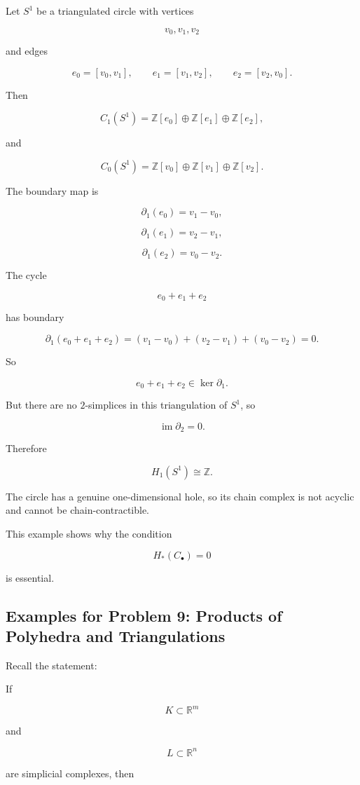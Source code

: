 \documentclass[12pt,a4paper]{article}
\theoremstyle{notespace}
\begin{document}
Let \(S^1\) be a triangulated circle with vertices

\[
v_0,v_1,v_2
\]

and edges

\[
e_0=[v_0,v_1],
\qquad
e_1=[v_1,v_2],
\qquad
e_2=[v_2,v_0].
\]

Then

\[
C_1(S^1)=\mathbb Z[e_0]\oplus \mathbb Z[e_1]\oplus \mathbb Z[e_2],
\]

and

\[
C_0(S^1)=\mathbb Z[v_0]\oplus \mathbb Z[v_1]\oplus \mathbb Z[v_2].
\]

The boundary map is

\[
\partial_1(e_0)=v_1-v_0,
\]

\[
\partial_1(e_1)=v_2-v_1,
\]

\[
\partial_1(e_2)=v_0-v_2.
\]

The cycle

\[
e_0+e_1+e_2
\]

has boundary

\[
\partial_1(e_0+e_1+e_2)
=
(v_1-v_0)+(v_2-v_1)+(v_0-v_2)=0.
\]

So

\[
e_0+e_1+e_2\in \ker\partial_1.
\]

But there are no \(2\)-simplices in this triangulation of \(S^1\), so

\[
\operatorname{im}\partial_2=0.
\]

Therefore

\[
H_1(S^1)\cong \mathbb Z.
\]

The circle has a genuine one-dimensional hole, so its chain complex is not acyclic and cannot be chain-contractible.

This example shows why the condition

\[
H_*(C_\bullet)=0
\]

is essential.

\subsection{Examples for Problem 9: Products of Polyhedra and Triangulations}

Recall the statement:

If

\[
K\subset \mathbb R^m
\]

and

\[
L\subset \mathbb R^n
\]

are simplicial complexes, then
\end{document}
